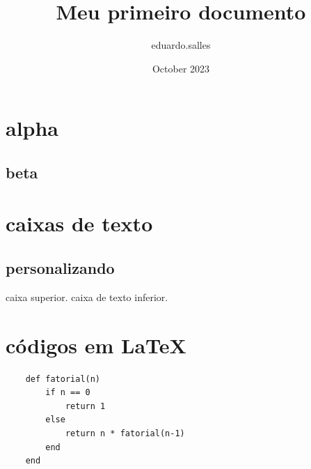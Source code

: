 \documentclass{article}
\title{Meu primeiro documento}
\author{eduardo.salles}
\date{October 2023}
\begin{document}
\maketitle

\section{alpha}
\lipsum[1]

\subsection{beta}
\lipsum[1]

\newpage

\section{caixas de texto}

\begin{tcolorbox}
    \lipsum[1]
\end{tcolorbox}

\subsection{personalizando}

\begin{tcolorbox}[colback=red!5!white,colfram=red!75!black,title=meu titulo]
    caixa superior.
    \lipsum[1]
    \tcblower
    caixa de texto inferior.
    \lipsum[1]
\end{tcolorbox}

\newpage

\section{códigos em LaTeX}

\begin{verbatim}
    def fatorial(n)
        if n == 0
            return 1
        else
            return n * fatorial(n-1)
        end
    end
\end{verbatim}
\end{document}
